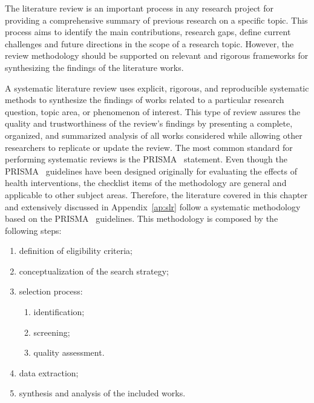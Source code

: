 The literature review is an important process in any research project for providing a comprehensive summary of previous research on a specific topic.
This process aims to identify the main contributions, research gaps, define current challenges and future directions in the scope of a research topic.
However, the review methodology should be supported on relevant and rigorous frameworks for synthesizing the findings of the literature works.

A systematic literature review uses explicit, rigorous, and reproducible systematic methods to synthesize the findings of works related to a particular research question, topic area, or phenomenon of interest.
This type of review assures the quality and trustworthiness of the review's findings by presenting a complete, organized, and summarized analysis of all works considered while allowing other researchers to replicate or update the review.
The most common standard for performing systematic reviews is the \gls{PRISMA}~\cite{methodology:prisma} statement. Even though the \gls{PRISMA}~\cite{methodology:prisma} guidelines have been designed originally for evaluating the effects of health interventions, the checklist items of the methodology are general and applicable to other subject areas.
Therefore, the literature covered in this chapter and extensively discussed in Appendix~\ref{ap:slr} follow a systematic methodology based on the \gls{PRISMA}~\cite{methodology:prisma} guidelines. This methodology is composed by the following steps:

\begin{enumerate}[nosep]
\item definition of eligibility criteria;
\item conceptualization of the search strategy;
\item selection process:
  \begin{enumerate}[nosep]
  \item identification;
  \item screening;
  \item quality assessment.
  \end{enumerate}
\item data extraction;
\item synthesis and analysis of the included works.
\end{enumerate}

